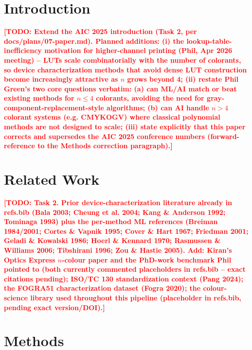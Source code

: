 \documentclass[11pt,a4paper]{article}
\newcommand{\todonote}[1]{\textcolor{red}{\textbf{[TODO: #1]}}}
\begin{document}
\section{Introduction}
\todonote{Extend the AIC 2025 introduction (Task 2, per docs/plans/07-paper.md).
Planned additions: (i) the lookup-table-inefficiency motivation for
higher-channel printing (Phil, Apr 2026 meeting) -- LUTs scale combinatorially
with the number of colorants, so device characterization methods that avoid
dense LUT construction become increasingly attractive as $n$ grows beyond 4;
(ii) restate Phil Green's two core questions verbatim: (a) can ML/AI match or
beat existing methods for $n \leq 4$ colorants, avoiding the need for
gray-component-replacement-style algorithms; (b) can AI handle $n>4$ colorant
systems (e.g. CMYKOGV) where classical polynomial methods are not designed to
scale; (iii) state explicitly that this paper corrects and supersedes the AIC
2025 conference numbers (forward-reference to the Methods correction
paragraph).}

\section{Related Work}
\todonote{Task 2. Prior device-characterization literature already in
refs.bib (Bala 2003; Cheung et al. 2004; Kang \& Anderson 1992; Tominaga
1993) plus the per-method ML references (Breiman 1984/2001; Cortes \& Vapnik
1995; Cover \& Hart 1967; Friedman 2001; Geladi \& Kowalski 1986; Hoerl \&
Kennard 1970; Rasmussen \& Williams 2006; Tibshirani 1996; Zou \& Hastie
2005). Add: Kiran's Optics Express $n$-colour paper and the PhD-work
benchmark Phil pointed to (both currently commented placeholders in
refs.bib -- exact citations pending); ISO/TC 130 standardization context
(Pang 2024); the FOGRA51 characterization dataset (Fogra 2020); the
colour-science library used throughout this pipeline (placeholder in
refs.bib, pending exact version/DOI).}

\section{Methods}
\end{document}
